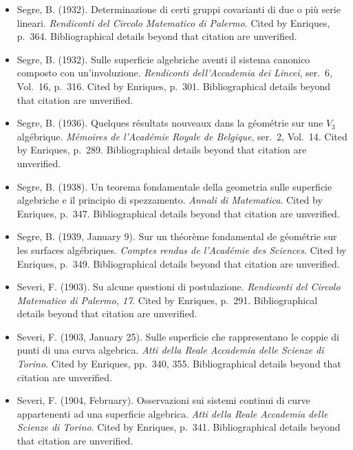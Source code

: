 \begin{sloppypar}
\begin{itemize}
\item Segre, B. (1932). Determinazione di certi gruppi covarianti di due o più serie lineari. \emph{Rendiconti del Circolo Matematico di Palermo}. Cited by Enriques, p.~364. Bibliographical details beyond that citation are unverified.

\item Segre, B. (1932). Sulle superficie algebriche aventi il sistema canonico composto con un'involuzione. \emph{Rendiconti dell'Accademia dei Lincei}, ser.~6, Vol.~16, p.~316. Cited by Enriques, p.~301. Bibliographical details beyond that citation are unverified.

\item Segre, B. (1936). Quelques résultats nouveaux dans la géométrie sur une $V_3$ algébrique. \emph{Mémoires de l'Académie Royale de Belgique}, ser.~2, Vol.~14. Cited by Enriques, p.~289. Bibliographical details beyond that citation are unverified.

\item Segre, B. (1938). Un teorema fondamentale della geometria sulle superficie algebriche e il principio di spezzamento. \emph{Annali di Matematica}. Cited by Enriques, p.~347. Bibliographical details beyond that citation are unverified.

\item Segre, B. (1939, January 9). Sur un théorème fondamental de géométrie sur les surfaces algébriques. \emph{Comptes rendus de l'Académie des Sciences}. Cited by Enriques, p.~349. Bibliographical details beyond that citation are unverified.

\item Severi, F. (1903). Su alcune questioni di postulazione. \emph{Rendiconti del Circolo Matematico di Palermo, 17}. Cited by Enriques, p.~291. Bibliographical details beyond that citation are unverified.

\item Severi, F. (1903, January 25). Sulle superficie che rappresentano le coppie di punti di una curva algebrica. \emph{Atti della Reale Accademia delle Scienze di Torino}. Cited by Enriques, pp.~340, 355. Bibliographical details beyond that citation are unverified.

\item Severi, F. (1904, February). Osservazioni sui sistemi continui di curve appartenenti ad una superficie algebrica. \emph{Atti della Reale Accademia delle Scienze di Torino}. Cited by Enriques, p.~341. Bibliographical details beyond that citation are unverified.


\end{itemize}
\end{sloppypar}
